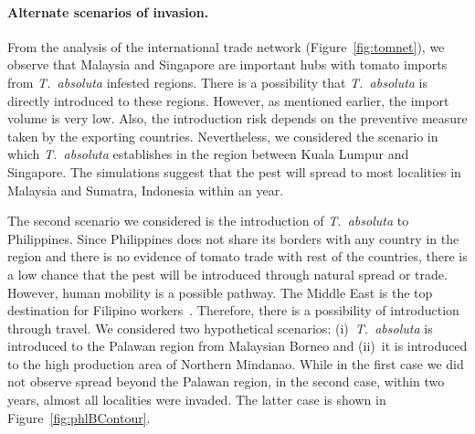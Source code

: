 \documentclass[11pt]{article}
\newcommand{\tuta}{\emph{T.~absoluta}}
\newcommand{\mooreRange}{r_\mathrm{M}}
\theoremstyle{definition}
\begin{document}


\paragraph{Alternate scenarios of invasion.}
From the analysis of the international trade network
(Figure~\ref{fig:tomnet}), we observe that Malaysia and Singapore are
important hubs with tomato imports from \tuta{} infested regions. There is
a possibility that \tuta{} is directly introduced to these regions. However,
as mentioned earlier, the import volume is very low. Also, the introduction
risk depends on the preventive measure taken by the exporting countries.
Nevertheless, we considered the scenario in which \tuta{} establishes in the region
between Kuala Lumpur and Singapore. The simulations suggest that the pest
will spread to most localities in Malaysia and Sumatra, Indonesia within an
year.

The second scenario we considered is the introduction of \tuta{} to
Philippines. Since Philippines does not share its borders with any country in the region
and there is no evidence of tomato trade with rest of the countries, there
is a low chance that the pest will be introduced through natural spread or
trade.  However, human mobility is a possible pathway. The Middle East is
the top destination for Filipino workers~\cite{rodriguez2011philippine}.
Therefore, there is a possibility of introduction through travel. We
considered two hypothetical scenarios: (i)~\tuta{} is introduced to the Palawan region
from Malaysian Borneo and (ii)~it is introduced to the high production area
of Northern Mindanao. While in the first case we did not observe spread
beyond the Palawan region, in the second case, within two years, almost all
localities were invaded. The latter case is shown in
Figure~\ref{fig:phlBContour}.
\end{document}
